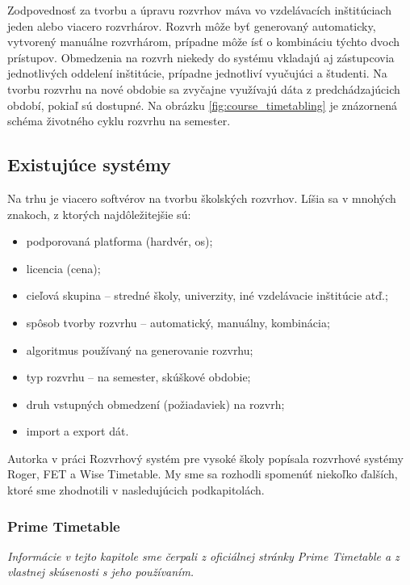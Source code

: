 Zodpovednosť za tvorbu a úpravu rozvrhov máva vo vzdelávacích inštitúciach jeden
alebo viacero rozvrhárov. Rozvrh môže byť generovaný automaticky, vytvorený
manuálne rozvrhárom, prípadne môže ísť o kombináciu týchto dvoch prístupov.
Obmedzenia na rozvrh niekedy do systému vkladajú aj zástupcovia jednotlivých
oddelení inštitúcie, prípadne jednotliví vyučujúci a študenti. Na tvorbu rozvrhu
na nové obdobie sa zvyčajne využívajú dáta z predchádzajúcich období, pokiaľ sú
dostupné. Na obrázku \ref{fig:course_timetabling} je znázornená schéma životného
cyklu rozvrhu na semester.

\subsection{Existujúce systémy}
\label{subsec:existing_systems}

Na trhu je viacero softvérov na tvorbu školských rozvrhov. Líšia sa v mnohých
znakoch, z ktorých najdôležitejšie sú:

\begin{itemize}
\item podporovaná platforma (hardvér, \acrshort{os});
\item licencia (cena);
\item cieľová skupina -- stredné školy, univerzity, iné vzdelávacie inštitúcie
  atď.;
\item spôsob tvorby rozvrhu -- automatický, manuálny, kombinácia;
\item algoritmus používaný na generovanie rozvrhu;
\item typ rozvrhu -- na semester, skúškové obdobie;
\item druh vstupných obmedzení (požiadaviek) na rozvrh;
\item import a export dát.
\end{itemize}

Autorka v práci Rozvrhový systém pre vysoké školy \cite{knap} popísala rozvrhové
systémy Roger, FET a Wise Timetable. My sme sa rozhodli spomenúť niekoľko
ďalších, ktoré sme zhodnotili v nasledujúcich podkapitolách.

\subsubsection{Prime Timetable}
\label{subsubsec:prime_timetable}

\emph{Informácie v tejto kapitole sme čerpali z oficiálnej stránky Prime
  Timetable \cite{prime_timetable} a z vlastnej skúsenosti s jeho používaním.}

